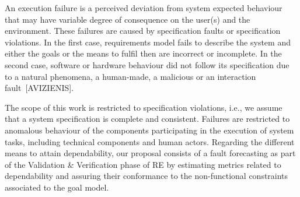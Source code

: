 An execution failure is a perceived deviation from system expected behaviour that may have variable degree of consequence on the user(s) and the environment. These failures are caused by specification faults or specification violations. In the first case, requirements model fails to describe the system and either the goals or the means to fulfil then are incorrect or incomplete. In the second case, software or hardware behaviour did not follow its specification due to a natural phenomena, a human-made, a malicious or an interaction fault~[AVIZIENIS].


The scope of this work is restricted to specification violations, i.e., we assume that a system specification is complete and consistent. Failures are restricted to anomalous behaviour of the components participating in the execution of system tasks, including technical components and human actors. Regarding the different means to attain dependability, our proposal consists of a fault forecasting as part of the Validation \& Verification phase of RE by estimating metrics related to dependability and assuring their conformance to the non-functional constraints associated to the goal model. 

